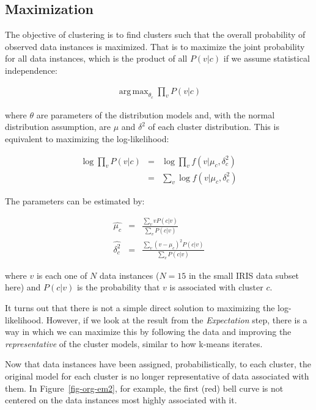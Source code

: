 \documentclass[
  letterpaper,
]{scrbook}
\begin{document}
\subsection{Maximization}\label{maximization}

The objective of clustering is to find clusters such that the overall
probability of observed data instances is maximized. That is to maximize
the joint probability for all data instances, which is the product of
all \(P(v|c)\) if we assume statistical independence:

\[\begin{aligned}
  \mathop{\mathrm{arg\,max}}_{\theta_c} \prod_v P(v|c)
\end{aligned}\]

where \(\theta\) are parameters of the distribution models and, with the
normal distribution assumption, are \(\mu\) and \(\delta^2\) of each
cluster distribution. This is equivalent to maximizing the
log-likelihood:

\[\begin{aligned}
    \log \prod_v P(v|c)
    & = & \log \prod_v f(v|\mu_c,\delta_c^2) \\
    & = & \sum_v \log f(v|\mu_c,\delta_c^2)
\end{aligned}\]

The parameters can be estimated by:

\[\begin{aligned}
  \hat{\mu_c} & = & \frac{\sum_v v P(c|v)}{\sum_v P(c|v)} \\
  \hat{\delta_c^2} & = & \frac{\sum_v (v - \hat{\mu_c})^2 P(c|v)}{\sum_v P(c|v)}
\end{aligned}\]

where \(v\) is each one of \(N\) data instances (\(N=15\) in the small
IRIS data subset here) and \(P(c|v)\) is the probability that \(v\) is
associated with cluster \(c\).

It turns out that there is not a simple direct solution to maximizing
the log-likelihood. However, if we look at the result from the
\emph{Expectation} step, there is a way in which we can maximize this by
following the data and improving the \emph{representative} of the
cluster models, similar to how k-means iterates.

Now that data instances have been assigned, probabilistically, to each
cluster, the original model for each cluster is no longer representative
of data associated with them. In Figure~\ref{fig-org-em2}, for example,
the first (red) bell curve is not centered on the data instances most
highly associated with it.
\end{document}
